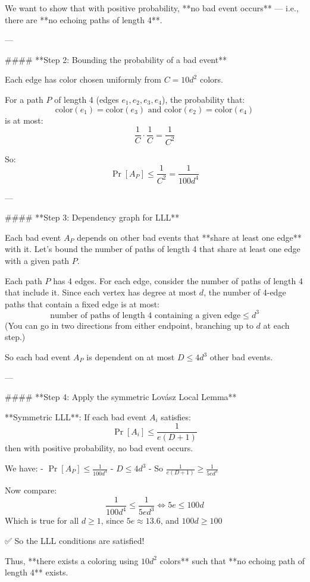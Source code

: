 \begin{enumerate}
\begin{shaded}
We want to show that with positive probability, **no bad event occurs** — i.e., there are **no echoing paths of length 4**.

---

#### **Step 2: Bounding the probability of a bad event**

Each edge has color chosen uniformly from \(C = 10d^2\) colors.

For a path \(P\) of length 4 (edges \(e_1, e_2, e_3, e_4\)), the probability that:
\[
\text{color}(e_1) = \text{color}(e_3) \text{ and } \text{color}(e_2) = \text{color}(e_4)
\]
is at most:
\[
\frac{1}{C} \cdot \frac{1}{C} = \frac{1}{C^2}
\]

So:  
\[
\Pr[A_P] \leq \frac{1}{C^2} = \frac{1}{100d^4}
\]

---

#### **Step 3: Dependency graph for LLL**

Each bad event \(A_P\) depends on other bad events that **share at least one edge** with it.  
Let's bound the number of paths of length 4 that share at least one edge with a given path \(P\).

Each path \(P\) has 4 edges. For each edge, consider the number of paths of length 4 that include it. Since each vertex has degree at most \(d\), the number of 4-edge paths that contain a fixed edge is at most:
\[
\text{number of paths of length 4 containing a given edge} \leq d^3
\]
(You can go in two directions from either endpoint, branching up to \(d\) at each step.)

So each bad event \(A_P\) is dependent on at most \(D \leq 4d^3\) other bad events.

---

#### **Step 4: Apply the symmetric Lovász Local Lemma**

**Symmetric LLL**: If each bad event \(A_i\) satisfies:
\[
\Pr[A_i] \leq \frac{1}{e(D+1)}
\]
then with positive probability, no bad event occurs.

We have:
- \(\Pr[A_P] \leq \frac{1}{100d^4}\)
- \(D \leq 4d^3\)
- So \(\frac{1}{e(D+1)} \geq \frac{1}{5e d^3}\)

Now compare:
\[
\frac{1}{100d^4} \leq \frac{1}{5e d^3} \iff 5e \leq 100d
\]
Which is true for all \(d \geq 1\), since \(5e \approx 13.6\), and \(100d \geq 100\)

✅ So the LLL conditions are satisfied!

Thus, **there exists a coloring using \(10d^2\) colors** such that **no echoing path of length 4** exists.


\end{shaded}
\end{enumerate}
